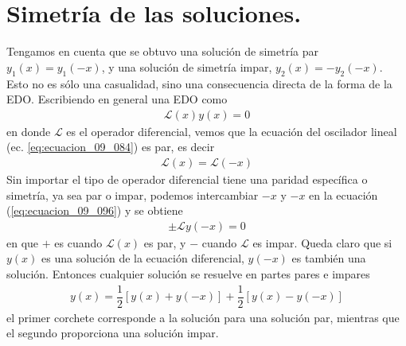 \section*{Simetría de las soluciones.}
Tengamos en cuenta que se obtuvo una solución de simetría par $y_{1}(x) = y_{1} (-x)$, y una solución de simetría impar, $y_{2}(x) = - y_{2}(-x)$. Esto no es sólo una casualidad, sino una consecuencia directa de la forma de la EDO. Escribiendo en general una EDO como
\begin{align}
\mathcal{L}(x) y(x) = 0
\label{eq:ecuacion_09_096}
\end{align}
en donde $\mathcal{L}$ es el operador diferencial, vemos que la ecuación del oscilador lineal (ec. \ref{eq:ecuacion_09_084}) es par, es decir
\begin{align}
\mathcal{L}(x) = \mathcal{L}(-x)
\label{eq:ecuacion_09_097}
\end{align}
Sin importar el tipo de operador diferencial tiene una paridad específica o simetría, ya sea par o impar, podemos intercambiar $-x$ y $-x$ en la ecuación (\ref{eq:ecuacion_09_096}) y se obtiene
\begin{align}
\pm \mathcal{L} y(-x) = 0
\label{eq:ecuacion_09_098}
\end{align}
en que $+$ es cuando $\mathcal{L}(x)$ es par, y $-$ cuando $\mathcal{L}$ es impar. Queda claro que si $y(x)$ es una solución de la ecuación diferencial, $y(-x)$ es también una solución. Entonces cualquier solución se resuelve en partes pares e impares
\begin{align}
y(x) = \dfrac{1}{2} \left[ y(x) + y(-x) \right] + \dfrac{1}{2} \left[ y(x) - y (-x) \right]
\label{eq:ecuacion_09_099}
\end{align}
el primer corchete corresponde a la solución para una solución par, mientras que el segundo proporciona una solución impar.
